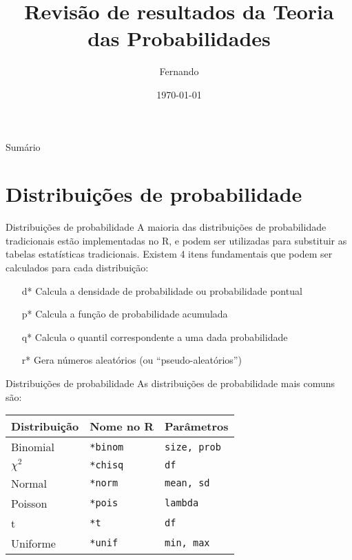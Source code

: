 \documentclass[10pt]{beamer}\usepackage{graphicx, color}
\title{Revisão de resultados da Teoria das Probabilidades}
\author[MATH 232]{Fernando}
\date{\today}
\providecommand{\R}{\textsf{R}\xspace}
\begin{document}
\begin{frame}
\maketitle
\end{frame}

\begin{frame}{Sumário}
\tableofcontents
\end{frame}

\section{Distribuições de probabilidade}

\begin{frame}[fragile=singleslide]{Distribuições de probabilidade}
A maioria das distribuições de probabilidade tradicionais estão
implementadas no R, e podem ser utilizadas para substituir as tabelas
estatísticas tradicionais. Existem 4 itens fundamentais que podem ser
calculados para cada distribuição:
\begin{itemize}
\item[d*] Calcula a densidade de probabilidade ou probabilidade pontual
\item[p*] Calcula a função de probabilidade acumulada
\item[q*] Calcula o quantil correspondente a uma dada probabilidade
\item[r*] Gera números aleatórios (ou ``pseudo-aleatórios'')
\end{itemize}
\end{frame}

\begin{frame}[fragile=singleslide]{Distribuições de probabilidade}
As distribuições de probabilidade mais comuns são:
\begin{center}
\begin{tabular}{lll}
\hline
Distribuição & Nome no \R & Parâmetros \\
\hline
Binomial & \texttt{*binom} & \texttt{size, prob} \\
$\chi^2$ & \texttt{*chisq} & \texttt{df} \\

Normal & \texttt{*norm} & \texttt{mean, sd} \\
Poisson & \texttt{*pois} & \texttt{lambda} \\
t & \texttt{*t} & \texttt{df} \\
Uniforme & \texttt{*unif} & \texttt{min, max}\\
\hline
\end{tabular}
\end{center}
\end{frame}
\end{document}
